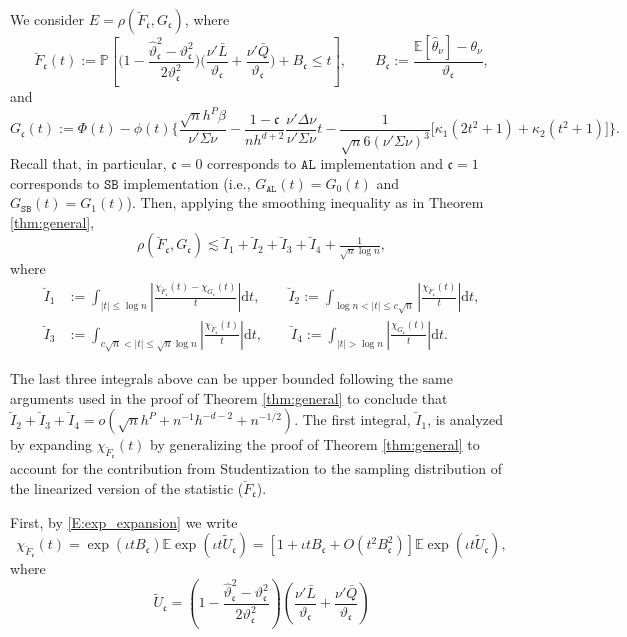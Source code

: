 \documentclass[11pt]{article}
\numberwithin{equation}{section}
\theoremstyle{definition}
\renewcommand{\P}{\mathbb{P}}
\newcommand{\E}{\mathbb{E}}
\def\ls{\lesssim}
\def\d{\mathrm{d}}
\newcommand{\Scale}{\vartheta}
\begin{document}
We consider $E=\rho(\breve{F}_\mathfrak{c},G_\mathfrak{c})$, where
\[\breve{F}_\mathfrak{c}(t) := \P\left[\Big(1 - \frac{\widehat{\Scale}_\mathfrak{c}^2 - \Scale_\mathfrak{c}^2}{2\Scale_\mathfrak{c}^2} \Big)
    \Big(\frac{\nu'\bar{L}}{\Scale_\mathfrak{c}} + \frac{\nu'\bar{Q}}{\Scale_\mathfrak{c}}\Big) + B_\mathfrak{c} \leq t\right], \qquad
  B_\mathfrak{c} := \frac{\E[\widehat{\theta}_\nu]-\theta_\nu}{\Scale_\mathfrak{c}},
\]
and 
\[G_\mathfrak{c}(t) := \Phi(t) -\phi(t)\Big\{\frac{\sqrt{n}h^P\beta}{\nu'\Sigma\nu} - \frac{1-\mathfrak{c}}{nh^{d+2}} \frac{\nu'\Delta\nu}{\nu'\Sigma\nu} t - \frac{1}{\sqrt{n} 6(\nu'\Sigma\nu)^3}\Big[\kappa_1 (2t^2+1) + \kappa_2 (t^2+1)\Big]\Big\}.\]
Recall that, in particular, $\mathfrak{c}=0$ corresponds to $\mathtt{AL}$ implementation and $\mathfrak{c}=1$ corresponds to $\mathtt{SB}$ implementation (i.e., $G_\mathtt{AL}(t)=G_0(t)$ and $G_\mathtt{SB}(t)=G_1(t)$). Then, applying the smoothing inequality as in Theorem \ref{thm:general},
\begin{equation*}
    \rho(\breve{F}_\mathfrak{c},G_\mathfrak{c}) \ls \breve{I}_1 + \breve{I}_2 + \breve{I}_3 + \breve{I}_4 +\tfrac{1}{\sqrt{n}\log n},
\end{equation*}
where 
\begin{align*}
\breve{I}_1&:=\int_{|t|\leq\log n}\left |\frac{\chi_{\breve{F}_\mathfrak{c}}(t)-\chi_{G_\mathfrak{c}}(t)}{t}\right|\d t, \qquad
\breve{I}_2:=\int_{\log n<|t|\leq c \sqrt{n}}\left |\frac{\chi_{\breve{F}_\mathfrak{c}}(t)}{t}\right|\d t, \\
\breve{I}_3&:=\int_{c \sqrt{n}<|t|\leq \sqrt{n}\log n}\left |\frac{\chi_{\breve{F}_\mathfrak{c}}(t)}{t}\right|\d t, \qquad
\breve{I}_4:=\int_{|t|>\log n}\left |\frac{\chi_{G_\mathfrak{c}}(t)}{t}\right|\d t.
\end{align*}

The last three integrals above can be upper bounded following the same arguments used in the proof of Theorem \ref{thm:general} to conclude that $\breve{I}_2 + \breve{I}_3 + \breve{I}_4=o(\sqrt{n}h^P + n^{-1}h^{-d-2} + n^{-1/2})$. The first integral, $\breve{I}_1$, is analyzed by expanding $\chi_{\breve{F}_\mathfrak{c}}(t)$ by generalizing the proof of Theorem \ref{thm:general} to account for the contribution from Studentization to the sampling distribution of the linearized version of the statistic ($\breve{F}_\mathfrak{c}$).

First, by \eqref{E:exp_expansion} we write
\begin{equation}\label{E:expansion_stundent_bias}
\chi_{\breve{F}_\mathfrak{c}}(t)=\exp (\iota t B_\mathfrak{c})\E\exp(\iota t \widetilde{U}_\mathfrak{c}) = \left[1+ \iota t B_\mathfrak{c} + O(t^2B_\mathfrak{c}^2)\right]\E\exp( \iota t \widetilde{U}_\mathfrak{c}),
\end{equation}
 where
\[\widetilde{U}_\mathfrak{c}
  = \left(1 - \frac{\widehat{\Scale}_\mathfrak{c}^2 - \Scale_\mathfrak{c}^2}{2\Scale_\mathfrak{c}^2} \right)\left(\frac{\nu'\bar{L}}{\Scale_\mathfrak{c}} + \frac{\nu'\bar{Q}}{\Scale_\mathfrak{c}}\right) \]
\end{document}
